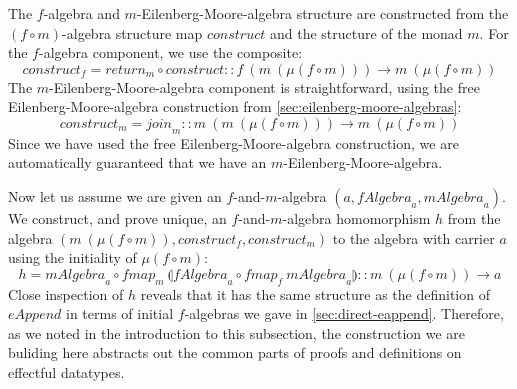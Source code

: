 \documentclass{jfp1}
\newcommand{\fold}[1]{\llparenthesis #1 \rrparenthesis}
\begin{document}
\begin{proof*}
  The $f$-algebra and $m$-Eilenberg-Moore-algebra structure are
  constructed from the $(f \circ m)$-algebra structure map
  $\mathit{construct}$ and the structure of the monad $m$.  For the
  $f$-algebra component, we use the composite:
  \begin{displaymath}
    \mathit{construct}_f = \mathit{return}_m \circ \mathit{construct} :: f~(m~(\mu(f \circ m))) \to m~(\mu(f \circ m))
  \end{displaymath}
  The $m$-Eilenberg-Moore-algebra component is straightforward, using
  the free Eilenberg-Moore-algebra construction from
  \autoref{sec:eilenberg-moore-algebras}:
  \begin{displaymath}
    \mathit{construct}_m = \mathit{join}_m :: m~(m~(\mu(f \circ m))) \to m~(\mu(f \circ m))
  \end{displaymath}
  Since we have used the free Eilenberg-Moore-algebra construction, we
  are automatically guaranteed that we have an
  $m$-Eilenberg-Moore-algebra.

  Now let us assume we are given an $f$-and-$m$-algebra $(a,
  \mathit{fAlgebra}_a, \mathit{mAlgebra}_a)$. We construct, and prove
  unique, an $f$-and-$m$-algebra homomorphism $h$ from the algebra
  $(m~(\mu(f \circ m)), \mathit{construct}_f, \mathit{construct}_m)$
  to the algebra with carrier $a$ using the initiality of $\mu(f \circ
  m)$:
  \begin{displaymath}
    h = \mathit{mAlgebra}_a \circ \mathit{fmap}_m~\fold{\mathit{fAlgebra}_a \circ \mathit{fmap}_f~\mathit{mAlgebra}_a} :: m~(\mu(f \circ m)) \to a
  \end{displaymath}
  Close inspection of $h$ reveals that it has the same structure as
  the definition of $\mathit{eAppend}$ in terms of initial
  $f$-algebras we gave in \autoref{sec:direct-eappend}. Therefore, as
  we noted in the introduction to this subsection, the construction we
  are buliding here abstracts out the common parts of proofs and
  definitions on effectful datatypes.


\end{proof*}
\end{document}
